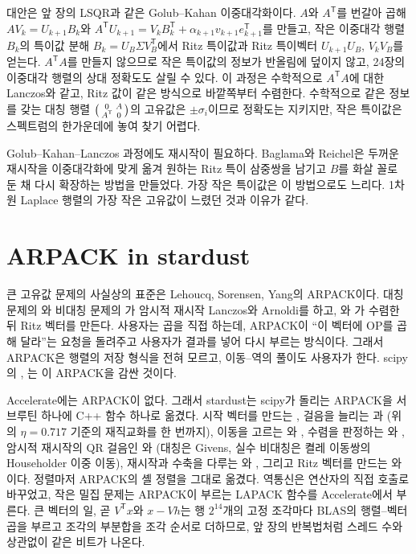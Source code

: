 대안은 앞 장의 LSQR과 같은 Golub--Kahan 이중대각화이다\cite{golub1965kahan}. $A$와 $A^{\mathsf T}$를 번갈아 곱해 $AV_k=U_{k+1}B_k$와 $A^{\mathsf T}U_{k+1}=V_kB_k^{\mathsf T}+\alpha_{k+1}v_{k+1}e_{k+1}^{\mathsf T}$를 만들고, 작은 이중대각 행렬 $B_k$의 특이값 분해 $B_k=U_B\Sigma V_B^{\mathsf T}$에서 Ritz 특이값과 Ritz 특이벡터 $U_{k+1}U_B$, $V_kV_B$를 얻는다. $A^{\mathsf T}A$를 만들지 않으므로 작은 특이값의 정보가 반올림에 덮이지 않고, 24장의 이중대각 행렬의 상대 정확도도 살릴 수 있다. 이 과정은 수학적으로 $A^{\mathsf T}A$에 대한 Lanczos와 같고, Ritz 값이 같은 방식으로 바깥쪽부터 수렴한다. 수학적으로 같은 정보를 갖는 대칭 행렬 $\begin{psmallmatrix}0&A\\A^{\mathsf T}&0\end{psmallmatrix}$의 고유값은 $\pm\sigma_i$이므로 정확도는 지키지만, 작은 특이값은 스펙트럼의 한가운데에 놓여 찾기 어렵다.

Golub--Kahan--Lanczos 과정에도 재시작이 필요하다. Baglama와 Reichel은 두꺼운 재시작을 이중대각화에 맞게 옮겨 원하는 Ritz 특이 삼중쌍을 남기고 $B$를 화살 꼴로 둔 채 다시 확장하는 방법을 만들었다\cite{baglama2005}. 가장 작은 특이값은 이 방법으로도 느리다. 1차원 Laplace 행렬의 가장 작은 고유값이 느렸던 것과 이유가 같다.

\section{ARPACK in stardust}
\label{sec:arpack-stardust}

큰 고유값 문제의 사실상의 표준은 Lehoucq, Sorensen, Yang의 ARPACK이다\cite{lehoucq1998arpack}. 대칭 문제의 와 비대칭 문제의 가 암시적 재시작 Lanczos와 Arnoldi를 하고, 와 가 수렴한 뒤 Ritz 벡터를 만든다. 사용자는 곱을 직접 하는데, ARPACK이 ``이 벡터에 OP를 곱해 달라''는 요청을 돌려주고 사용자가 결과를 넣어 다시 부르는  방식이다. 그래서 ARPACK은 행렬의 저장 형식을 전혀 모르고, 이동--역의 풀이도 사용자가 한다. scipy의 , 는 이 ARPACK을 감싼 것이다.

\begin{instardust}
Accelerate에는 ARPACK이 없다. 그래서 stardust는 scipy가 돌리는 ARPACK을 서브루틴 하나에 C++ 함수 하나로 옮겼다. 시작 벡터를 만드는 , 걸음을 늘리는 과 (위의 $\eta=0.717$ 기준의 재직교화를 한 번까지), 이동을 고르는 와 , 수렴을 판정하는 와 , 암시적 재시작의 QR 걸음인 와 (대칭은 Givens, 실수 비대칭은 켤레 이동쌍의 Householder 이중 이동), 재시작과 수축을 다루는 와 , 그리고 Ritz 벡터를 만드는 와 이다. 정렬마저 ARPACK의 셸 정렬을 그대로 옮겼다. 역통신은 연산자의 직접 호출로 바꾸었고, 작은 밀집 문제는 ARPACK이 부르는 LAPACK 함수를 Accelerate에서 부른다. 큰 벡터의 일, 곧 $V^{\mathsf T}x$와 $x-Vh$는 행 $2^{14}$개의 고정 조각마다 BLAS의 행렬--벡터 곱을 부르고 조각의 부분합을 조각 순서로 더하므로, 앞 장의 반복법처럼 스레드 수와 상관없이 같은 비트가 나온다.
\end{instardust}

